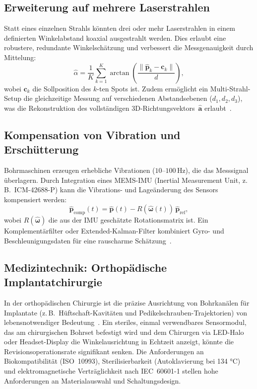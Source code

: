 ﻿\documentclass[a4paper,12pt]{article}
\theoremstyle{definition}
\begin{document}
\subsection{Erweiterung auf mehrere Laserstrahlen}

Statt eines einzelnen Strahls könnten drei oder mehr Laserstrahlen in einem
definierten Winkelabstand koaxial ausgestrahlt werden.
Dies erlaubt eine robustere, redundante Winkelschätzung und verbessert die
Messgenauigkeit durch Mittelung:
\[
  \hat{\alpha} = \frac{1}{K}\sum_{k=1}^{K} \arctan\!\left(\frac{\|\hat{\mathbf{p}}_k - \mathbf{c}_k\|}{d}\right),
\]
wobei $\mathbf{c}_k$ die Sollposition des $k$-ten Spots ist.
Zudem ermöglicht ein Multi-Strahl-Setup die gleichzeitige Messung auf
verschiedenen Abstandsebenen ($d_1, d_2, d_3$), was die Rekonstruktion
des vollständigen 3D-Richtungsvektors~$\hat{\mathbf{a}}$ erlaubt~\cite{luxbacher2020multi}.

\subsection{Kompensation von Vibration und Erschütterung}

Bohrmaschinen erzeugen erhebliche Vibrationen ($10$--$100\,\mathrm{Hz}$),
die das Messsignal überlagern. Durch Integration eines MEMS-IMU
(Inertial Measurement Unit, z.\,B.\ ICM-42688-P) kann die Vibrations-
und Lageänderung des Sensors kompensiert werden:
\[
  \hat{\mathbf{p}}_{\mathrm{comp}}(t) = \hat{\mathbf{p}}(t)
    - R(\hat{\boldsymbol{\omega}}(t))\, \hat{\mathbf{p}}_{\mathrm{ref}},
\]
wobei $R(\hat{\boldsymbol{\omega}})$ die aus der IMU geschätzte Rotationsmatrix ist.
Ein Komplementärfilter oder Extended-Kalman-Filter kombiniert Gyro- und
Beschleunigungsdaten für eine rauscharme Schätzung~\cite{madgwick2010efficient}.

\subsection{Medizintechnik: Orthopädische Implantatchirurgie}

In der orthopädischen Chirurgie ist die präzise Ausrichtung von Bohrkanälen
für Implantate (z.\,B.\ Hüftschaft-Kavitäten und Pedikelschrauben-Trajektorien)
von lebensnotwendiger Bedeutung~\cite{liebergall2009image}.
Ein steriles, einmal verwendbares Sensormodul, das am chirurgischen Bohrset
befestigt wird und dem Chirurgen via LED-Halo oder Headset-Display die
Winkelausrichtung in Echtzeit anzeigt, könnte die Revisions\-operations\-rate
signifikant senken.
Die Anforderungen an Biokompatibilität (ISO~10993), Sterilisierbarkeit
(Autoklavierung bei 134 °C) und elektromagnetische Verträglichkeit nach
IEC~60601-1 stellen hohe Anforderungen an Materialauswahl und Schaltungsdesign.
\end{document}
